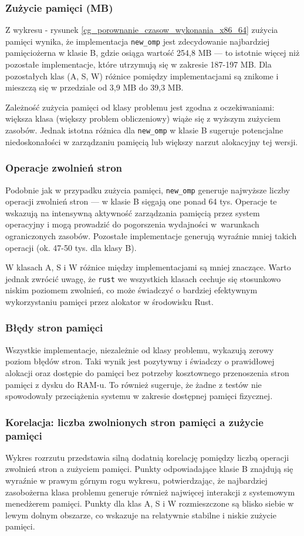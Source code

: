 \subsubsection{Zużycie pamięci (MB)}
Z wykresu - rysunek \ref{cg_porownanie_czasow_wykonania_x86_64} zużycia pamięci wynika, że implementacja \texttt{new\_omp} jest zdecydowanie najbardziej pamięciożerna w klasie B, gdzie osiąga wartość 254,8 MB — to istotnie więcej niż pozostałe implementacje, które utrzymują się w zakresie 187-197 MB. Dla pozostałych klas (A, S, W) różnice pomiędzy implementacjami są znikome i mieszczą się w przedziale od 3,9 MB do 39,3 MB.

Zależność zużycia pamięci od klasy problemu jest zgodna z oczekiwaniami: większa klasa (większy problem obliczeniowy) wiąże się z wyższym zużyciem zasobów. Jednak istotna różnica dla \texttt{new\_omp} w klasie B sugeruje potencjalne niedoskonałości w zarządzaniu pamięcią lub większy narzut alokacyjny tej wersji.

\subsubsection{Operacje zwolnień stron}
Podobnie jak w przypadku zużycia pamięci, \texttt{new\_omp} generuje najwyższe liczby operacji zwolnień stron — w klasie B sięgają one ponad 64 tys. Operacje te wskazują na intensywną aktywność zarządzania pamięcią przez system operacyjny i mogą prowadzić do pogorszenia wydajności w~warunkach ograniczonych zasobów. Pozostałe implementacje generują wyraźnie mniej takich operacji (ok. 47-50 tys. dla klasy B).

W klasach A, S i W różnice między implementacjami są mniej znaczące. Warto jednak zwrócić uwagę, że \texttt{rust} we wszystkich klasach cechuje się stosunkowo niskim poziomem zwolnień, co może świadczyć o bardziej efektywnym wykorzystaniu pamięci przez alokator w środowisku Rust.

\subsubsection{Błędy stron pamięci}
Wszystkie implementacje, niezależnie od klasy problemu, wykazują zerowy poziom błędów stron. Taki wynik jest pozytywny i świadczy o prawidłowej alokacji oraz dostępie do pamięci bez potrzeby kosztownego przenoszenia stron pamięci z dysku do RAM-u. To również sugeruje, że żadne z testów nie spowodowały przeciążenia systemu w zakresie dostępnej pamięci fizycznej.

\subsubsection{Korelacja: liczba zwolnionych stron pamięci a zużycie pamięci}
Wykres rozrzutu przedstawia silną dodatnią korelację pomiędzy liczbą operacji zwolnień stron a zużyciem pamięci. Punkty odpowiadające klasie B znajdują się wyraźnie w prawym górnym rogu wykresu, potwierdzając, że najbardziej zasobożerna klasa problemu generuje również najwięcej interakcji z systemowym menedżerem pamięci. Punkty dla klas A, S i W rozmieszczone są blisko siebie w lewym dolnym obszarze, co wskazuje na relatywnie stabilne i niskie zużycie pamięci.

